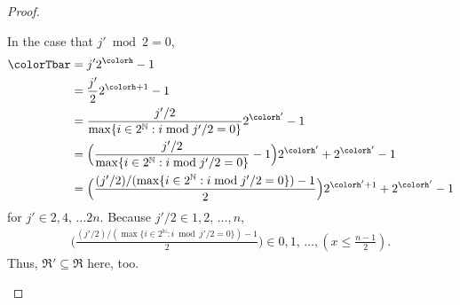 \begin{proof}
\begin{proofpart}
In the case that $j' \bmod 2 = 0$,
\begin{align*}
\colorTbar
&= j'2^{\colorh} - 1\\
&= \frac{j'}{2}2^{\colorh + 1} - 1\\
&= \frac{j'/2}{\max\{ i \in 2^{\mathbb{N}} : i \bmod j'/2 = 0 \}}2^{\colorh'} - 1\\
&= \Big(\frac{j'/2}{\max\{ i \in 2^{\mathbb{N}} : i \bmod j'/2 = 0 \}} - 1\Big) 2^{\colorh'} + 2^{\colorh'} - 1\\
&= \Big(\frac{(j'/2)/(\max\{ i \in 2^{\mathbb{N}} : i \bmod j'/2 = 0 \}) - 1}{2}\Big) 2^{\colorh' + 1} + 2^{\colorh'} - 1\\
\end{align*}
for $j' \in 2, 4, \,\ldots 2n$.
Because $j'/2 \in 1, 2, \, \ldots, n$,
\begin{align*}
\Big(\frac{(j'/2)/(\max\{ i \in 2^{\mathbb{N}} : i \bmod j'/2 = 0 \}) - 1}{2}\Big)
\in 0,1, \, \ldots, (x \leq \frac{n - 1}{2}).
\end{align*}
Thus,  $\mathfrak{R}' \subseteq \mathfrak{R}$ here, too.
\end{proofpart}
\end{proof}
